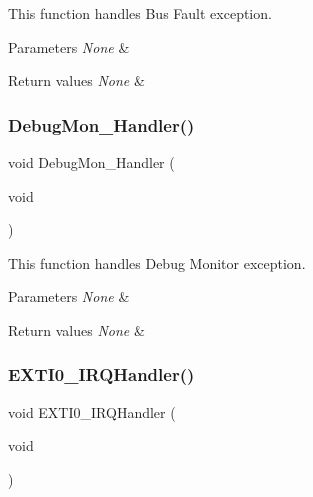 This function handles Bus Fault exception. 


\begin{DoxyParams}{Parameters}
{\em None} & \\
\hline
\end{DoxyParams}

\begin{DoxyRetVals}{Return values}
{\em None} & \\
\hline
\end{DoxyRetVals}
\mbox{\label{group__UART__TwoBoards__ComIT_ga735f6cb6de12b1453d16db32dba3d2a8}} 
\subsubsection{\texorpdfstring{Debug\+Mon\+\_\+\+Handler()}{DebugMon\_Handler()}}
{\footnotesize\ttfamily void Debug\+Mon\+\_\+\+Handler (\begin{DoxyParamCaption}\item[{void}]{ }\end{DoxyParamCaption})}



This function handles Debug Monitor exception. 


\begin{DoxyParams}{Parameters}
{\em None} & \\
\hline
\end{DoxyParams}

\begin{DoxyRetVals}{Return values}
{\em None} & \\
\hline
\end{DoxyRetVals}
\mbox{\label{group__UART__TwoBoards__ComIT_gafd87c60b1444bdac059ec64438a07c9d}} 
\subsubsection{\texorpdfstring{E\+X\+T\+I0\+\_\+\+I\+R\+Q\+Handler()}{EXTI0\_IRQHandler()}}
{\footnotesize\ttfamily void E\+X\+T\+I0\+\_\+\+I\+R\+Q\+Handler (\begin{DoxyParamCaption}\item[{void}]{ }\end{DoxyParamCaption})}



